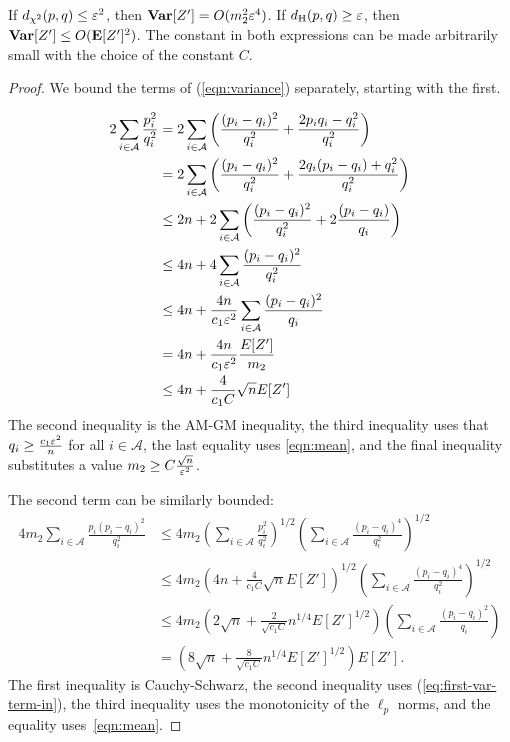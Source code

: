 \begin{lemma}
\label{lem:vars}
If $d_{\chi^2}(p,q) \leq \varepsilon^2$, then $\mbox{\bf Var}[Z'] = O(m_2^2 \varepsilon^4)$. 
If $d_{\mathrm {H}}(p,q) \geq \varepsilon$, then $\mbox{\bf Var}[Z'] \leq O(\mbox{\bf E}[Z']^2)$.
The constant in both expressions can be made arbitrarily small with the choice of the constant $C$.
\end{lemma}
\begin{proof}
We bound the terms of (\ref{eqn:variance}) separately, starting with the first.

\begin{align}
2\sum_{i \in \mathcal{A}} \frac{p_i^2}{q_i^2} &= 2\sum_{i \in \mathcal{A}} \left(\frac{(p_i - q_i)^2}{q_i^2} + \frac{2p_iq_i - q_i^2}{q_i^2}\right) \nonumber \\
                                             &= 2\sum_{i \in \mathcal{A}} \left(\frac{(p_i - q_i)^2}{q_i^2} + \frac{2q_i(p_i - q_i) + q_i^2}{q_i^2}\right) \nonumber\\
                                             &\leq 2n + 2\sum_{i \in \mathcal{A}} \left(\frac{(p_i - q_i)^2}{q_i^2} + 2\frac{(p_i - q_i)}{q_i}\right) \nonumber\\
                                             &\leq 4n + 4\sum_{i \in \mathcal{A}} \frac{(p_i - q_i)^2}{q_i^2} \nonumber\\
                                             &\leq 4n + \frac{4n}{c_1\varepsilon^2} \sum_{i \in \mathcal{A}} \frac{(p_i - q_i)^2}{q_i}\nonumber\\
                                             &= 4n + \frac{4n}{c_1\varepsilon^2}\frac{E[Z']}{m_2} \nonumber\\
                                             &\leq 4n + \frac{4}{c_1C}\sqrt{n} E[Z']\label{eq:first-var-term-in}
\end{align}
The second inequality is the AM-GM inequality, the third inequality uses that $q_i \geq \frac{c_1\varepsilon^2}{n}$ for all $i \in \mathcal{A}$, the last equality uses \eqref{eqn:mean}, and the final inequality substitutes a value $m_2 \geq C\frac{\sqrt{n}}{\varepsilon^2}$.

The second term can be similarly bounded:
\begin{align*}
4m_2 \sum_{i \in \mathcal{A}} \frac{p_i(p_i - q_i)^2}{q_i^2} &\leq 4m_2 \left(\sum_{i \in \mathcal{A}} \frac{p_i^2}{q_i^2}\right)^{1/2}\left(\sum_{i \in \mathcal{A}} \frac{(p_i - q_i)^4}{q_i^2}\right)^{1/2} \\
                                                          &\leq 4m_2 \left(4n + \frac{4}{c_1C}\sqrt{n} E[Z'] \right)^{1/2}\left(\sum_{i \in \mathcal{A}} \frac{(p_i - q_i)^4}{q_i^2}\right)^{1/2} \\
                                                          &\leq 4m_2 \left(2\sqrt{n} + \frac{2}{\sqrt{c_1C}}n^{1/4} E[Z']^{1/2}\right)\left(\sum_{i \in \mathcal{A}} \frac{(p_i - q_i)^2}{q_i}\right) \\
                                                          &= \left(8\sqrt{n} + \frac{8}{\sqrt{c_1C}}n^{1/4} E[Z']^{1/2}\right)E[Z'].
\end{align*}
The first inequality is Cauchy-Schwarz, the second inequality uses (\ref{eq:first-var-term-in}), the third inequality uses the monotonicity of the $\ell_p$ norms, and the equality uses~\eqref{eqn:mean}.


\end{proof}
